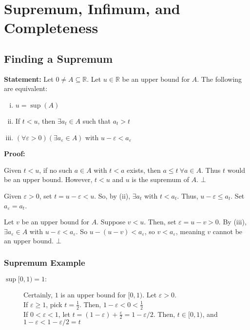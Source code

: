 \documentclass[10pt]{extarticle}
\newcommand{\R}{\mathbb{R}}
\begin{document}
  \section{Supremum, Infimum, and Completeness}%
  \subsection{Finding a Supremum}%
  \textbf{Statement:} Let $0\neq A\subseteq \R$. Let $u\in\R$ be an upper bound for $A$. The following are equivalent:
    \begin{enumerate}[(i)]
      \item $u=\sup(A)$
      \item If $t<u$, then $\exists a_t\in A$ such that $a_t > t$
      \item $(\forall \varepsilon > 0)(\exists a_{\varepsilon}\in A)$ with $u-\varepsilon < a_{\varepsilon}$
    \end{enumerate}
    \textbf{Proof:}
      \begin{description}[font=\normalfont]
        \item[(i) $\Rightarrow$ (ii):] Given $t < u$, if no such $a\in A$ with $t < a$ exists, then $a \leq t~\forall a\in A$. Thus $t$ would be an upper bound. However, $t < u$ and $u$ is the supremum of $A$. $\bot$
        \item[(ii) $\Rightarrow$ (iii):] Given $\varepsilon > 0$, set $t = u-\varepsilon < u$. So, by (ii), $\exists a_t$ with $t < a_t$. Thus, $u-\varepsilon \leq a_t$. Set $a_{\varepsilon} = a_t$.
        \item[(iii) $\Rightarrow$ (i):] Let $v$ be an upper bound for $A$. Suppose $v < u$. Then, set $\varepsilon = u-v > 0$. By (iii), $\exists a_{\varepsilon}\in A$ with $u-\varepsilon < a_{\varepsilon}$. So $u-(u-v) < a_{\varepsilon}$, so $v < a_{\varepsilon}$, meaning $v$ cannot be an upper bound. $\bot$
      \end{description}
      \subsubsection{Supremum Example}%
      \begin{description}
        \item[$\sup [0,1) = 1:$] Certainly, $1$ is an upper bound for $[0,1)$. Let $\varepsilon > 0$.\\

          If $\varepsilon \geq 1$, pick $t = \frac{1}{2}$. Then, $1-\varepsilon < 0 < \frac{1}{2}$\\

          If $0 < \varepsilon < 1$, let $t = (1-\varepsilon) + \frac{\varepsilon}{2} = 1-\varepsilon/2$. Then, $t\in [0,1)$, and $1-\varepsilon < 1-\varepsilon/2 = t$
      \end{description}
\end{document}
